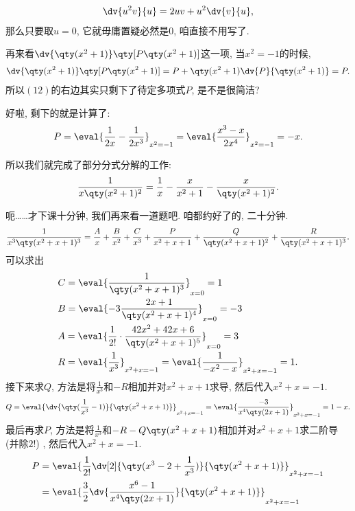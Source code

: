 \documentclass{ctexbook}
\begin{document}
{\begin{align*}
\dv{u^{2}v}{u}=2uv+u^{2}\dv{v}{u}
,\end{align*}
那么只要取$u=0$, 它就毋庸置疑必然是$0$, 咱直接不用写了. \par
再来看$\dv{\qty(x^{2}+1)}\qty[P\qty(x^{2}+1)]$这一项, 当$x^{2}=-1$的时候, 
\begin{align*}
\dv{\qty(x^{2}+1)}\qty[P\qty(x^{2}+1)]=P+\qty(x^{2}+1)\dv{P}{\qty(x^{2}+1)}=P
.\end{align*}
所以$(12)$的右边其实只剩下了待定多项式$P$, 是不是很简洁? \par
好啦, 剩下的就是计算了: 
\begin{align*}
P=\eval{\frac{1}{2x}-\frac{1}{2x^{3}}}_{x^{2}=-1}=\eval{\frac{x^{3}-x}{2x^{4}}}_{x^{2}=-1}=-x
.\end{align*}\par
所以我们就完成了部分分式分解的工作: 
\begin{align*}
\frac{1}{x\qty(x^{2}+1)^{2}}=\frac{1}{x}-\frac{x}{x^{2}+1}-\frac{x}{\qty(x^{2}+1)^{2}}
.\end{align*}\par
呃……才下课十分钟, 我们再来看一道题吧. 咱都约好了的, 二十分钟.
\begin{align*}
\frac{1}{x^{3}\qty(x^{2}+x+1)^{3}}=\frac{A}{x}+\frac{B}{x^{2}}+\frac{C}{x^{3}}+\frac{P}{x^{2}+x+1}+\frac{Q}{\qty(x^{2}+x+1)^{2}}+\frac{R}{\qty(x^{2}+x+1)^{3}}
.\end{align*}
可以求出
\begin{align*}
{}&C=\eval{\frac{1}{\qty(x^{2}+x+1)^{3}}}_{x=0}=1\\
{}&B=\eval{-3\frac{2x+1}{\qty(x^{2}+x+1)^{4}}}_{x=0}=-3\\
{}&A=\eval{\frac{1}{2!}\cdot\frac{42x^{2}+42x+6}{\qty(x^{2}+x+1)^{5}}}_{x=0}=3\\
{}&R=\eval{\frac{1}{x^{3}}}_{x^{2}+x=-1}=\eval{\frac{1}{-x^{2}-x}}_{x^{2}+x=-1}=1
.\end{align*}
接下来求$Q$, 方法是将$\frac{1}{x^{3}}$和$-R$相加并对$x^{2}+x+1$求导, 然后代入$x^{2}+x=-1$. 
\begin{align*}
Q=\eval{\dv{\qty(\frac{1}{x^{3}}-1)}{\qty(x^{2}+x+1)}}_{x^{2}+x=-1}=\eval{\frac{-3}{x^{4}\qty(2x+1)}}_{x^{2}+x=-1}=1-x
.\end{align*}
最后再求$P$, 方法是将$\frac{1}{x^{3}}$和$-R-Q\qty(x^{2}+x+1)$相加并对$x^{2}+x+1$求二阶导 (并除$2!$) , 然后代入$x^{2}+x=-1$. 
\begin{align*}
P={}&\eval{\frac{1}{2!}\dv[2]{\qty(x^{3}-2+\frac{1}{x^{3}})}{\qty(x^{2}+x+1)}}_{x^{2}+x=-1}\\
={}&\eval{\frac{3}{2}\dv{\frac{x^{6}-1}{x^{4}\qty(2x+1)}}{\qty(x^{2}+x+1)}}_{x^{2}+x=-1}\\

\end{align*}}
\end{document}
